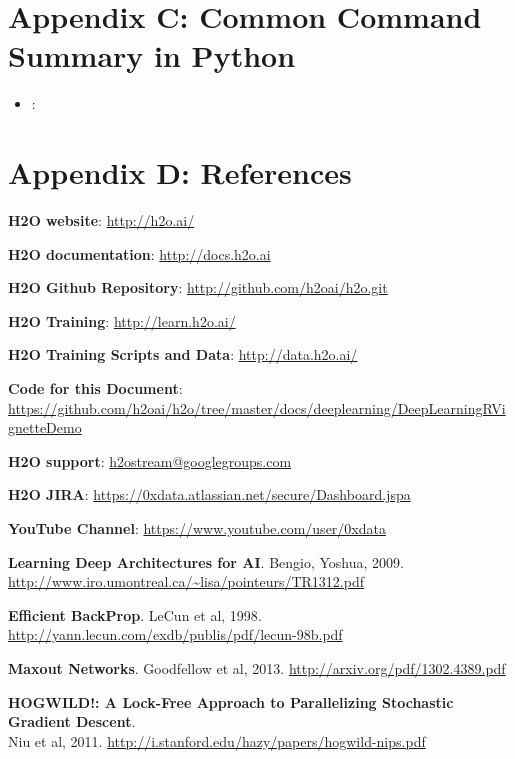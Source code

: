 \newpage

\section{Appendix C: Common Command Summary in Python}
\begin{itemize}

\item \texttt{}:


\end{itemize}




\newpage
\section{Appendix D: References}

\textbf{H2O website}:  {\url{http://h2o.ai/}}

\textbf{H2O documentation}:  {\url{http://docs.h2o.ai}}

\textbf{H2O Github Repository}:  {\url{http://github.com/h2oai/h2o.git}}

\textbf{H2O Training}:    {\url{http://learn.h2o.ai/}}

\textbf{H2O Training Scripts and Data}: {\url{http://data.h2o.ai/}} 

\textbf{Code for this Document}:   \\
 {\url{https://github.com/h2oai/h2o/tree/master/docs/deeplearning/DeepLearningRVignetteDemo}}

\textbf{H2O support}:   {\url{h2ostream@googlegroups.com}}

\textbf{H2O JIRA}: {\url{https://0xdata.atlassian.net/secure/Dashboard.jspa}}

\textbf{YouTube Channel}: {\url{https://www.youtube.com/user/0xdata}}

\textbf{Learning Deep Architectures for AI}. Bengio, Yoshua, 2009. \\
 {\url{http://www.iro.umontreal.ca/~lisa/pointeurs/TR1312.pdf}}

\textbf{Efficient BackProp}.  {LeCun et al, 1998}. {\url{http://yann.lecun.com/exdb/publis/pdf/lecun-98b.pdf}}

\textbf{Maxout Networks}. {Goodfellow et al, 2013}.  {\url{http://arxiv.org/pdf/1302.4389.pdf}}

\textbf{HOGWILD!: A Lock-Free Approach to Parallelizing Stochastic Gradient Descent}.  \\
{Niu et al, 2011}.  {\url{http://i.stanford.edu/hazy/papers/hogwild-nips.pdf}}

